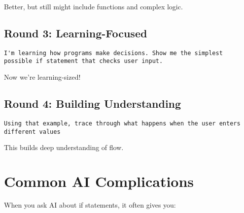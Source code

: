 \documentclass[
  letterpaper,
  DIV=11,
  numbers=noendperiod,
  oneside]{scrreprt}
\begin{document}
Better, but still might include functions and complex logic.

\subsection{Round 3: Learning-Focused}\label{round-3-learning-focused-3}

\begin{verbatim}
I'm learning how programs make decisions. Show me the simplest possible if statement that checks user input.
\end{verbatim}

Now we're learning-sized!

\subsection{Round 4: Building
Understanding}\label{round-4-building-understanding-2}

\begin{verbatim}
Using that example, trace through what happens when the user enters different values
\end{verbatim}

This builds deep understanding of flow.

\section{Common AI Complications}\label{common-ai-complications-3}

When you ask AI about if statements, it often gives you:
\end{document}
